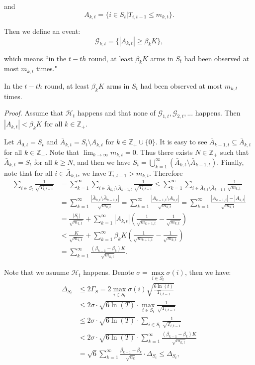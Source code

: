 \documentclass[opre,sglanonrev]{informs4}
\begin{document}
and 
$$ A_{k,t} = \{i \in S_t|T_{i,t-1}\leq m_{k,t}\}.$$

Then we define an event:
$$\mathcal{G}_{k,t}=\{|A_{k,t}|\geq\beta_kK\},$$

which means “in the $t-th$ round, at least $\beta_{k}K$ arms in $S_{t}$ had been observed at most $m_{k,t}$ times."

\begin{lemma}
In the $t-th$ round, at least $\beta_{k}K$ arms in $S_t$ had been observed at most $m_{k,t}$ times.
\end{lemma}

\textit{Proof.} Assume that $\mathcal{H}_t$ happens and that none of $\mathcal{G}_{1,t},\mathcal{G}_{2,t},...$ happens. Then $|A_{k,t}|<\beta_{k}K$ for all $k\in \mathbb{Z}_+$.

Let $A_{0,t} = S_t$ and $\bar{A}_{k,t}=S_t\setminus A_{k,t}$ for $k\in \mathbb{Z}_+\cup \{0\}$. It is easy to see $\bar{A}_{k-1,t}\subseteq\bar{A}_{k,t}$ for all $k\in \mathbb{Z}_+$. Note that $\lim_{k \to \infty}m_{k,t}=0$. Thus there exists $N\in \mathbb{Z}_+$ such that $\bar{A}_{k,t}=S_t$ for all $k\geq N$, and then we have $S_t=\bigcup_{k=1}^\infty\left(\bar{A}_{k,t}\setminus\bar{A}_{k-1,t}\right)$. Finally, note that for all $i\in \bar{A}_{k,t}$, we have $T_{i,t-1}>m_{k,t}$. Therefore
$$\begin{aligned}
\sum_{i\in S_t}\frac{1}{\sqrt{T_{i,t-1}}} & =\sum_{k=1}^\infty\sum_{i\in\bar{A}_{k,t}\setminus\bar{A}_{k-1,t}}\frac{1}{\sqrt{T_{i,t-1}}}\leq\sum_{k=1}^\infty\sum_{i\in\bar{A}_{k,t}\setminus\bar{A}_{k-1,t}}\frac{1}{\sqrt{m_{k,t}}} \\
 & =\sum_{k=1}^\infty\frac{\left|\bar{A}_{k,t}\setminus\bar{A}_{k-1,t}\right|}{\sqrt{m_{k,t}}}=\sum_{k=1}^\infty\frac{\left|A_{k-1,t}\setminus A_{k,t}\right|}{\sqrt{m_{k,t}}}=\sum_{k=1}^\infty\frac{\left|A_{k-1,t}\right|-\left|A_{k,t}\right|}{\sqrt{m_{k,t}}} \\
 & =\frac{|S_t|}{\sqrt{m_{1,t}}}+\sum_{k=1}^\infty|A_{k,t}|\left(\frac{1}{\sqrt{m_{k+1,t}}}-\frac{1}{\sqrt{m_{k,t}}}\right) \\
 & <\frac{K}{\sqrt{m_{1,t}}}+\sum_{k=1}^\infty\beta_kK\left(\frac{1}{\sqrt{m_{k+1,t}}}-\frac{1}{\sqrt{m_{k,t}}}\right) \\
 & =\sum_{k=1}^\infty\frac{(\beta_{k-1}-\beta_k)K}{\sqrt{m_{k,t}}}.
\end{aligned}$$

Note that we asuume $\mathcal{H}_t$ happens. Denote $\sigma = \mathop{\max}\limits_{i\in S_t}\sigma(i)$, then we have: 
$$\begin{aligned}
\Delta_{S_t} & \leq 2\Gamma_S=2\mathop{\max}\limits_{i\in S_t}\sigma(i)\sqrt{\frac{6\ln(t)}{T_{i,t-1}}}\\
&\leq 2\sigma \cdot \sqrt{6\ln(T)}\cdot \mathop{\max}\limits_{i\in S_t}\frac{1}{\sqrt{T_{i,t-1}}}\\
&\leq 2\sigma \cdot \sqrt{6\ln(T)}\cdot \sum_{i\in S_t}\frac{1}{\sqrt{T_{i,t-1}}}\\
&<2\sigma \cdot \sqrt{6\ln(T)}\cdot \sum_{k=1}^\infty\frac{(\beta_{k-1}-\beta_k)K}{\sqrt{m_{k,t}}}\\
&=\sqrt{6}\sum_{k=1}^\infty\frac{\beta_{k-1}-\beta_k}{\sqrt{\alpha_k}}\cdot \Delta_{S_t}\leq\Delta_{S_t},
\end{aligned}$$
\end{document}
